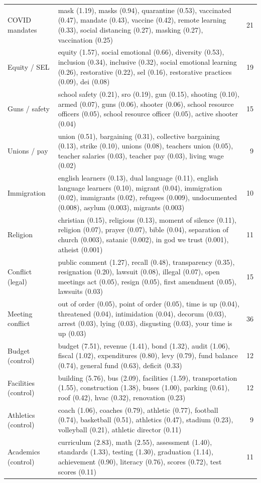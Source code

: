 \begin{landscape}
\begin{longtable}{@{}p{3.3cm}p{17.2cm}r@{}}
COVID mandates & mask (1.19), masks (0.94), quarantine (0.53), vaccinated (0.47), mandate (0.43), vaccine (0.42), remote learning (0.33), social distancing (0.27), masking (0.27), vaccination (0.25) & 21 \\[3pt]
Equity / SEL & equity (1.57), social emotional (0.66), diversity (0.53), inclusion (0.34), inclusive (0.32), social emotional learning (0.26), restorative (0.22), sel (0.16), restorative practices (0.09), dei (0.08) & 19 \\[3pt]
Guns / safety & school safety (0.21), sro (0.19), gun (0.15), shooting (0.10), armed (0.07), guns (0.06), shooter (0.06), school resource officers (0.05), school resource officer (0.05), active shooter (0.04) & 15 \\[3pt]
Unions / pay & union (0.51), bargaining (0.31), collective bargaining (0.13), strike (0.10), unions (0.08), teachers union (0.05), teacher salaries (0.03), teacher pay (0.03), living wage (0.02) & 9 \\[3pt]
Immigration & english learners (0.13), dual language (0.11), english language learners (0.10), migrant (0.04), immigration (0.02), immigrants (0.02), refugees (0.009), undocumented (0.008), asylum (0.003), migrants (0.003) & 10 \\[3pt]
Religion & christian (0.15), religious (0.13), moment of silence (0.11), religion (0.07), prayer (0.07), bible (0.04), separation of church (0.003), satanic (0.002), in god we trust (0.001), atheist (0.001) & 11 \\[3pt]
Conflict (legal) & public comment (1.27), recall (0.48), transparency (0.35), resignation (0.20), lawsuit (0.08), illegal (0.07), open meetings act (0.05), resign (0.05), first amendment (0.05), lawsuits (0.03) & 15 \\[3pt]
Meeting conflict & out of order (0.05), point of order (0.05), time is up (0.04), threatened (0.04), intimidation (0.04), decorum (0.03), arrest (0.03), lying (0.03), disgusting (0.03), your time is up (0.03) & 36 \\[3pt]
Budget (control) & budget (7.51), revenue (1.41), bond (1.32), audit (1.06), fiscal (1.02), expenditures (0.80), levy (0.79), fund balance (0.74), general fund (0.63), deficit (0.33) & 12 \\[3pt]
Facilities (control) & building (5.76), bus (2.09), facilities (1.59), transportation (1.55), construction (1.38), buses (1.00), parking (0.61), roof (0.42), hvac (0.32), renovation (0.23) & 12 \\[3pt]
Athletics (control) & coach (1.06), coaches (0.79), athletic (0.77), football (0.74), basketball (0.51), athletics (0.47), stadium (0.23), volleyball (0.21), athletic director (0.11) & 9 \\[3pt]
Academics (control) & curriculum (2.83), math (2.55), assessment (1.40), standards (1.33), testing (1.30), graduation (1.14), achievement (0.90), literacy (0.76), scores (0.72), test scores (0.11) & 11 \\[3pt]
\end{longtable}
\end{landscape}

